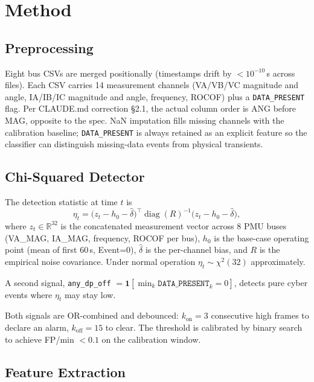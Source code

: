 \documentclass[conference]{IEEEtran}
\begin{document}
\section{Method}

\subsection{Preprocessing}

Eight bus CSVs are merged positionally (timestamps drift by $<10^{-10}$\,s
across files).  Each CSV carries 14 measurement channels
(VA/VB/VC magnitude and angle, IA/IB/IC magnitude and angle, frequency, ROCOF)
plus a \texttt{DATA\_PRESENT} flag.  Per CLAUDE.md correction \S2.1, the actual
column order is ANG before MAG, opposite to the spec.  NaN imputation fills
missing channels with the calibration baseline; \texttt{DATA\_PRESENT} is
always retained as an explicit feature so the classifier can distinguish
missing-data events from physical transients.

\subsection{Chi-Squared Detector}

The detection statistic at time $t$ is
\begin{equation}
  \eta_t = \bigl(z_t - h_0 - \hat\delta\bigr)^\top
           \operatorname{diag}(R)^{-1}
           \bigl(z_t - h_0 - \hat\delta\bigr),
\end{equation}
where $z_t \in \mathbb{R}^{32}$ is the concatenated measurement vector across
8 PMU buses (VA\_MAG, IA\_MAG, frequency, ROCOF per bus),
$h_0$ is the base-case operating point (mean of first 60\,s, Event=0),
$\hat\delta$ is the per-channel bias, and $R$ is the empirical noise covariance.
Under normal operation $\eta_t \sim \chi^2(32)$ approximately.

A second signal, \texttt{any\_dp\_off} $= \mathbf{1}[\min_k \texttt{DATA\_PRESENT}_k = 0]$,
detects pure cyber events where $\eta_t$ may stay low.

Both signals are OR-combined and debounced: $k_\text{on}=3$ consecutive high
frames to declare an alarm, $k_\text{off}=15$ to clear.  The threshold is
calibrated by binary search to achieve FP/min $< 0.1$ on the calibration window.

\subsection{Feature Extraction}
\end{document}
